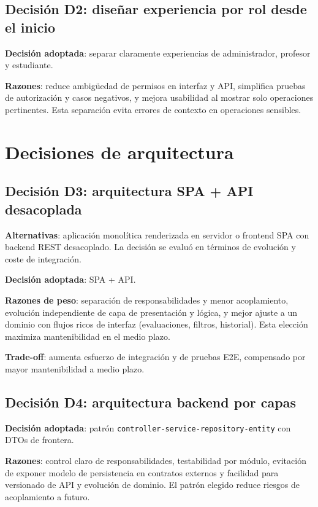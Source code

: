 \subsection{Decisi\'on D2: dise\~nar experiencia por rol desde el inicio}

\textbf{Decisi\'on adoptada}:
separar claramente experiencias de administrador, profesor y estudiante.

\textbf{Razones}: reduce ambig\"uedad de permisos en interfaz y API, simplifica pruebas de autorizaci\'on y casos negativos, y mejora usabilidad al mostrar solo operaciones pertinentes. Esta separaci\'on evita errores de contexto en operaciones sensibles.

\FloatBarrier
\section{Decisiones de arquitectura}

\subsection{Decisi\'on D3: arquitectura SPA + API desacoplada}

\textbf{Alternativas}: aplicaci\'on monol\'itica renderizada en servidor o frontend SPA con backend REST desacoplado. La decisi\'on se evalu\'o en t\'erminos de evoluci\'on y coste de integraci\'on.

\textbf{Decisi\'on adoptada}: SPA + API.

\textbf{Razones de peso}: separaci\'on de responsabilidades y menor acoplamiento, evoluci\'on independiente de capa de presentaci\'on y l\'ogica, y mejor ajuste a un dominio con flujos ricos de interfaz (evaluaciones, filtros, historial). Esta elecci\'on maximiza mantenibilidad en el medio plazo.

\textbf{Trade-off}:
aumenta esfuerzo de integraci\'on y de pruebas E2E,
compensado por mayor mantenibilidad a medio plazo.

\subsection{Decisi\'on D4: arquitectura backend por capas}

\textbf{Decisi\'on adoptada}:
patr\'on \texttt{controller-service-repository-entity} con DTOs de frontera.

\textbf{Razones}: control claro de responsabilidades, testabilidad por m\'odulo, evitaci\'on de exponer modelo de persistencia en contratos externos y facilidad para versionado de API y evoluci\'on de dominio. El patr\'on elegido reduce riesgos de acoplamiento a futuro.

